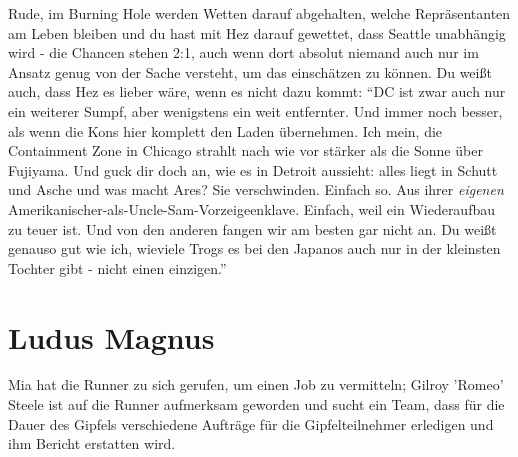 Rude, im Burning Hole werden Wetten darauf abgehalten, welche Repräsentanten am Leben bleiben und du hast mit Hez darauf gewettet, dass Seattle unabhängig wird - die Chancen stehen 2:1, auch wenn dort absolut niemand auch nur im Ansatz genug von der Sache versteht, um das einschätzen zu können. Du weißt auch, dass Hez es lieber wäre, wenn es nicht dazu kommt: ``DC ist zwar auch nur ein weiterer Sumpf, aber wenigstens ein weit entfernter. Und immer noch besser, als wenn die Kons hier komplett den Laden übernehmen. Ich mein, die Containment Zone in Chicago strahlt nach wie vor stärker als die Sonne über Fujiyama. Und guck dir doch an, wie es in Detroit aussieht: alles liegt in Schutt und Asche und was macht Ares? Sie verschwinden. Einfach so. Aus ihrer \textit{eigenen} Amerikanischer-als-Uncle-Sam-Vorzeigeenklave. Einfach, weil ein Wiederaufbau zu teuer ist. Und von den anderen fangen wir am besten gar nicht an. Du weißt genauso gut wie ich, wieviele Trogs es bei den Japanos auch nur in der kleinsten Tochter gibt - nicht einen einzigen.''


\section{Ludus Magnus}

Mia hat die Runner zu sich gerufen, um einen Job zu vermitteln; Gilroy 'Romeo' Steele ist auf die Runner aufmerksam geworden und sucht ein Team, dass für die Dauer des Gipfels verschiedene Aufträge für die Gipfelteilnehmer erledigen und ihm Bericht erstatten wird.

